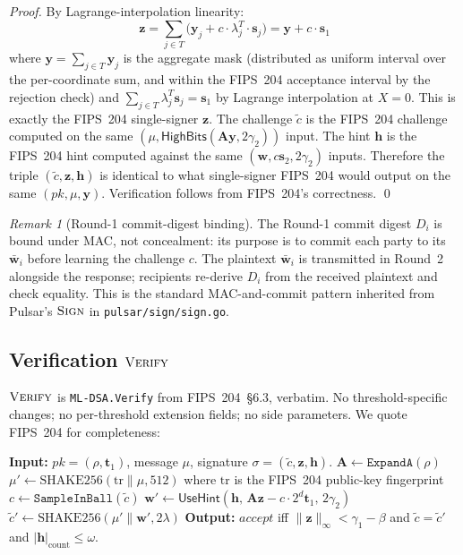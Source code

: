 \documentclass[11pt,a4paper]{article}
\theoremstyle{definition}
\theoremstyle{remark}
\newtheorem{remark}{Remark}
\newcommand{\SHAKE}{\mathrm{SHAKE256}}
\newcommand{\HighBits}{\mathsf{HighBits}}
\newcommand{\UseHint}{\mathsf{UseHint}}
\newcommand{\Sign}{\textsc{Sign}}
\newcommand{\Verify}{\textsc{Verify}}
\begin{document}
\begin{proof}
By Lagrange-interpolation linearity:
\[
\mathbf{z}
= \sum_{j \in T} \bigl(\mathbf{y}_j + c \cdot \lambda_j^T \cdot \mathbf{s}_j\bigr)
= \mathbf{y} + c \cdot \mathbf{s}_1
\]
where $\mathbf{y} = \sum_{j \in T} \mathbf{y}_j$ is the aggregate
mask (distributed as uniform interval over the per-coordinate sum,
and within the FIPS~204 acceptance interval by the rejection
check) and $\sum_{j \in T} \lambda_j^T \mathbf{s}_j = \mathbf{s}_1$
by Lagrange interpolation at $X = 0$. This is exactly the FIPS~204
single-signer $\mathbf{z}$. The challenge $\tilde c$ is the
FIPS~204 challenge computed on the same
$(\mu, \HighBits(\mathbf{A}\mathbf{y}, 2\gamma_2))$ input. The hint
$\mathbf{h}$ is the FIPS~204 hint computed against the same
$(\mathbf{w}, c\mathbf{s}_2, 2\gamma_2)$ inputs. Therefore the triple
$(\tilde c, \mathbf{z}, \mathbf{h})$ is identical to what
single-signer FIPS~204 would output on the same
$(\mathit{pk}, \mu, \mathbf{y})$. Verification follows from FIPS~204's
correctness. \qed
\end{proof}

\begin{remark}[Round-1 commit-digest binding]
The Round-1 commit digest $D_i$ is bound under MAC, not concealment:
its purpose is to commit each party to its
$\bar{\mathbf{w}}_i$ before learning the challenge $c$. The
plaintext $\bar{\mathbf{w}}_i$ is transmitted in Round~2 alongside
the response; recipients re-derive $D_i$ from the received plaintext
and check equality. This is the standard MAC-and-commit pattern
inherited from Pulsar's $\Sign$ in \texttt{pulsar/sign/sign.go}.
\end{remark}

\subsection{Verification \texorpdfstring{$\Verify$}{Verify}}
\label{sec:verify}

$\Verify$ is \texttt{ML-DSA.Verify} from FIPS~204~\S6.3, verbatim. No
threshold-specific changes; no per-threshold extension fields; no
side parameters. We quote FIPS~204 for completeness:

\begin{algorithm}[H]
\caption{$\Verify$ (\texttt{ML-DSA.Verify} per FIPS~204 \S6.3)}
\label{alg:verify}
\begin{algorithmic}[1]
\State \textbf{Input:} $\mathit{pk} = (\rho, \mathbf{t}_1)$, message $\mu$, signature $\sigma = (\tilde c, \mathbf{z}, \mathbf{h})$.
\State $\mathbf{A} \gets \texttt{ExpandA}(\rho)$
\State $\mu' \gets \SHAKE(\mathrm{tr} \| \mu, 512)$ where $\mathrm{tr}$ is the FIPS~204 public-key fingerprint
\State $c \gets \texttt{SampleInBall}(\tilde c)$
\State $\mathbf{w}' \gets \UseHint(\mathbf{h},\,\mathbf{A}\mathbf{z} - c \cdot 2^d \mathbf{t}_1,\,2\gamma_2)$
\State $\tilde c' \gets \SHAKE(\mu' \| \mathbf{w}', 2\lambda)$
\State \textbf{Output:}
$\mathit{accept}$ iff
$\|\mathbf{z}\|_\infty < \gamma_1 - \beta$
and
$\tilde c = \tilde c'$
and
$|\mathbf{h}|_{\mathrm{count}} \le \omega$.
\end{algorithmic}
\end{algorithm}
\end{document}
